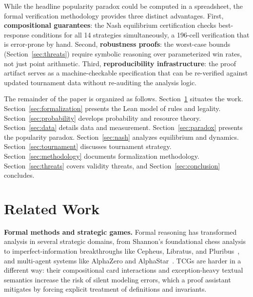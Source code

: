 \documentclass[journal]{IEEEtran}
\let\origsection\section
\renewcommand{\section}{\needspace{4\baselineskip}\origsection}
\begin{document}
While the headline popularity paradox could be computed in a spreadsheet, the formal verification methodology provides three distinct advantages.
First, \textbf{compositional guarantees}: the Nash equilibrium certification checks best-response conditions for all 14 strategies simultaneously, a 196-cell verification that is error-prone by hand.
Second, \textbf{robustness proofs}: the worst-case bounds (Section~\ref{sec:threats}) require symbolic reasoning over parameterized win rates, not just point arithmetic.
Third, \textbf{reproducibility infrastructure}: the proof artifact serves as a machine-checkable specification that can be re-verified against updated tournament data without re-auditing the analysis logic.

The remainder of the paper is organized as follows.
Section~\ref{sec:related} situates the work.
Section~\ref{sec:formalization} presents the Lean model of rules and legality.
Section~\ref{sec:probability} develops probability and resource theory.
Section~\ref{sec:data} details data and measurement.
Section~\ref{sec:paradox} presents the popularity paradox.
Section~\ref{sec:nash} analyzes equilibrium and dynamics.
Section~\ref{sec:tournament} discusses tournament strategy.
Section~\ref{sec:methodology} documents formalization methodology.
Section~\ref{sec:threats} covers validity threats, and Section~\ref{sec:conclusion} concludes.

\section{Related Work}\label{sec:related}

\textbf{Formal methods and strategic games.}
Formal reasoning has transformed analysis in several strategic domains, from Shannon's foundational chess analysis~\cite{shannon1950chess,schaefer1978complexity,fraenkel1981chess} to imperfect-information breakthroughs like Cepheus, Libratus, and Pluribus~\cite{bowling2015heads,brown2018superhuman,brown2019pluribus}, and multi-agent systems like AlphaZero and AlphaStar~\cite{silver2018general,vinyals2019alphastar}.
TCGs are harder in a different way: their compositional card interactions and exception-heavy textual semantics increase the risk of silent modeling errors, which a proof assistant mitigates by forcing explicit treatment of definitions and invariants.
\end{document}
